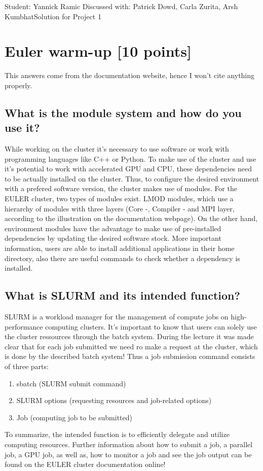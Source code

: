 \documentclass[unicode,11pt,a4paper,oneside,numbers=endperiod,openany]{scrartcl}
\begin{document}
\setassignment
{}

            {Student: Yannick Ramic}
            {Discussed with: Patrick Dowd, Carla Zurita, Arsh Kumbhat}{Solution for Project 1}{}
\newline

\assignmentpolicy

\section{Euler warm-up [10 points]}
This answers come from the documentation website, hence I won't cite anything properly.
\subsection{What is the module system and how do you use it?}
While working on the cluster it's necessary to use software or work with programming
languages like C++ or Python. To make use of the cluster and use it's potential to work
with accelerated GPU and CPU, these dependencies need to be actually installed on the 
cluster. Thus, to configure the desired environment with a prefered software version, the
cluster makes use of modules. For the EULER cluster, two types of modules exist. LMOD
modules, which use a hierarchy of modules with three layers (Core -, Compiler - and MPI layer,
according to the illustration on the documentation webpage). On the other hand, environment
modules have the advantage to make use of pre-installed dependencies by updating the
desired software stock. More important information, users are able to install additional
applications in their home directory, also there are useful commands to check whether a 
dependency is installed.
\subsection{What is SLURM and its intended function?}
SLURM is a workload manager for the management of compute jobs on high-performance computing 
clusters. It's important to know that 
users can solely use the cluster ressources through the batch system. During the lecture it
was made clear that for each job submitted we need ro make a request at the cluster,
which is done by the described batch system! Thus a job submission command consists of three
parts:
\begin{enumerate}
    \item sbatch (SLURM submit command)
    \item SLURM options (requesting resources and job-related options)
    \item Job (computing job to be submitted)
\end{enumerate}
To summarize, the intended function is to efficiently delegate and utilize computing resources.
Further information about how to submit a job, a parallel job, a GPU job, as well as, how to 
monitor a job and see the job output can be found on the EULER cluster documentation online!
\end{document}
